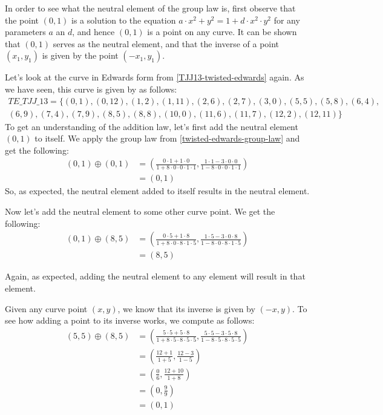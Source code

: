In order to see what the neutral element of the group law is, first observe that the point $(0,1)$ is a solution to the  equation $a\cdot x^{2} + y^2 =1+ d\cdot x^{2}\cdot y^2$ for any parameters $a$ an $d$, and hence $(0,1)$ is a point on any  curve. It can be shown that $(0,1)$ serves as the neutral element, and that the inverse of a point $(x_1, y_1)$ is given by the point $(-x_1, y_1)$.
\begin{example}
\label{example:TETJJ13}
 Let's look at the  curve in Edwards form from \eqref{TJJ13-twisted-edwards} again. As we have seen, this curve is given by as follows:
\begin{multline}
\mathit{TE\_TJJ\_13} = \{(0, 1),(0, 12),(1, 2),(1, 11),(2, 6),(2, 7),(3, 0),(5, 5),(5, 8),(6, 4),\\
(6, 9),(7, 4),(7, 9),(8, 5),(8, 8),(10, 0),(11, 6),(11, 7),(12, 2),(12, 11)\}
\end{multline}
To get an understanding of the  addition law, let's first add the neutral element $(0,1)$ to itself. We apply the group law from \eqref{twisted-edwards-group-law} and get the following:
\begin{align*}
(0, 1) \oplus (0, 1) &= \left(\frac{0\cdot 1+1 \cdot 0}{1 +8\cdot0\cdot 0\cdot 1\cdot 1},\frac{1\cdot 1-3\cdot 0\cdot 0}{1-8\cdot 0\cdot 0\cdot 1\cdot 1}\right)\\
                     & = (0,1)
\end{align*}
So, as expected, the neutral element added to itself results in the neutral element. 

Now let's add the neutral element to some other curve point. We get the following:
\begin{align*}
(0, 1) \oplus (8, 5) &= \left(\frac{0\cdot 5+1 \cdot 8}{1 +8\cdot0\cdot 8\cdot 1\cdot 5},\frac{1\cdot 5 - 3\cdot 0\cdot 8}{1-8\cdot 0\cdot 8\cdot 1\cdot 5}\right)\\
                     & = (8,5)
\end{align*}

Again, as expected, adding the neutral element to any element will result in that element. 

Given any curve point $(x,y)$, we know that its inverse is given by $(-x,y)$. To see how adding  a point to its inverse works, we compute as follows:
\begin{align*}
(5, 5) \oplus (8, 5) &= \left(\frac{5\cdot 5+5 \cdot 8}{1 +8\cdot 5\cdot 8\cdot 5\cdot 5},\frac{5\cdot 5 - 3\cdot 5\cdot 8}{1-8\cdot 5\cdot 8\cdot 5\cdot 5}\right)\\
                     &= \left(\frac{12+1}{1 +5},\frac{12 - 3}{1-5}\right)\\
                     &= \left(\frac{0}{6},\frac{12 + 10}{1+8}\right)\\
                     &= \left(0,\frac{9}{9}\right)\\
                     &=  (0,1)
\end{align*}


\end{example}
